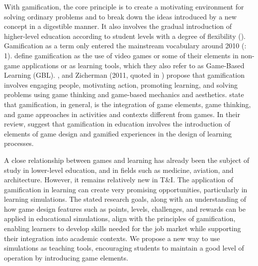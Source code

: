 \documentclass[output=paper]{langscibook}
\begin{document}
With gamification, the core principle is to create a motivating environment for solving ordinary problems and to break down the ideas introduced by a new concept in a digestible manner. It also involves the gradual introduction of higher-level education according to student levels with a degree of flexibility (\citealt{park2021leaderboard}). Gamification as a term only entered the mainstream vocabulary around 2010 (\citealt{dichev2017gamifying}: 1). \citet[345]{simoes2013social} define gamification as the use of video games or some of their elements in non-game applications or as learning tools, which they also refer to as Game-Based Learning (GBL). \citet{kapp2012gamification}, \citet{wang2021gamification} and Zicherman (2011, quoted in \citealt{deterding2011gamefulness}) propose that gamification involves engaging people, motivating action, promoting learning, and solving problems using game thinking and game-based mechanics and aesthetics. \citet[679]{kiryakova2014gamification} state that gamification, in general, is the integration of game elements, game thinking, and game approaches in activities and contexts different from games. In their review, \citet[2]{dichev2017gamifying} suggest that gamification in education involves the introduction of elements of game design and gamified experiences in the design of learning processes.

A close relationship between games and learning has already been the subject of study in lower-level education, and in fields such as medicine, aviation, and architecture. However, it remains relatively new in T\&I. The application of gamification in learning can create very promising opportunities, particularly in learning simulations. The stated research goals, along with an understanding of how game design features such as points, levels, challenges, and rewards can be applied in educational simulations, align with the principles of gamification, enabling learners to develop skills needed for the job market while supporting their integration into academic contexts. We propose a new way to use simulations as teaching tools, encouraging students to maintain a good level of operation by introducing game elements.
\end{document}
